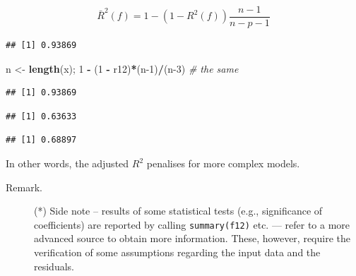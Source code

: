 \documentclass[10pt,b5paper,krantz1]{krantz}
\newenvironment{Shaded}{\begin{snugshade}}{\end{snugshade}}
\newcommand{\CommentTok}[1]{\textcolor[rgb]{0.37,0.37,0.37}{\textit{#1}}}
\newcommand{\DecValTok}[1]{\textcolor[rgb]{0.06,0.06,0.06}{#1}}
\newcommand{\KeywordTok}[1]{\textcolor[rgb]{0.27,0.27,0.27}{\textbf{#1}}}
\newcommand{\NormalTok}[1]{#1}
\newcommand{\OperatorTok}[1]{\textcolor[rgb]{0.43,0.43,0.43}{\textbf{#1}}}
\newcommand{\StringTok}[1]{\textcolor[rgb]{0.5,0.5,0.5}{#1}}
\begin{document}
\[
\bar{R}^2(f) = 1 - (1-{R}^2(f))\frac{n-1}{n-p-1}
\]

\begin{Shaded}
\end{Shaded}

\begin{verbatim}
## [1] 0.93869
\end{verbatim}

\begin{Shaded}
\begin{Highlighting}[]
\NormalTok{n <-}\StringTok{ }\KeywordTok{length}\NormalTok{(x); }\DecValTok{1} \OperatorTok{-}\StringTok{ }\NormalTok{(}\DecValTok{1} \OperatorTok{-}\StringTok{ }\NormalTok{r12)}\OperatorTok{*}\NormalTok{(n}\DecValTok{-1}\NormalTok{)}\OperatorTok{/}\NormalTok{(n}\DecValTok{-3}\NormalTok{) }\CommentTok{# the same}
\end{Highlighting}
\end{Shaded}

\begin{verbatim}
## [1] 0.93869
\end{verbatim}

\begin{Shaded}
\end{Shaded}

\begin{verbatim}
## [1] 0.63633
\end{verbatim}

\begin{Shaded}
\end{Shaded}

\begin{verbatim}
## [1] 0.68897
\end{verbatim}

In other words, the adjusted \(R^2\) penalises for more complex models.

\begin{description}
\item[Remark.]
(*) Side note -- results of some statistical tests (e.g., significance of coefficients)
are reported by calling \texttt{summary(f12)} etc. --- refer to a more advanced source to obtain more information.
These, however, require the verification of some assumptions regarding the input data
and the residuals.
\end{description}
\end{document}
